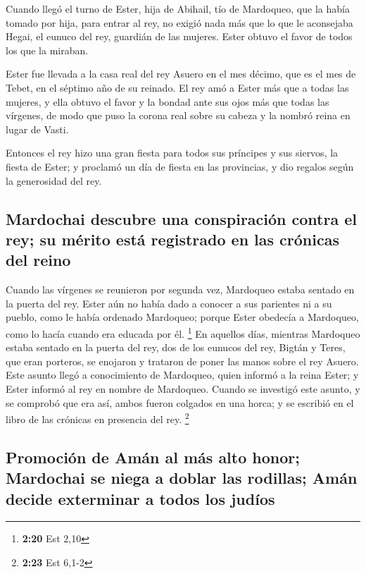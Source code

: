  Cuando llegó el turno de Ester, hija de Abihail, tío de
Mardoqueo, que la había tomado por hija, para entrar al rey, no exigió
nada más que lo que le aconsejaba Hegai, el eunuco del rey, guardián de
las mujeres. Ester obtuvo el favor de todos los que la miraban.

 Ester fue llevada a la casa real del rey Asuero en el
mes décimo, que es el mes de Tebet, en el séptimo año de su reinado.
 El rey amó a Ester más que a todas las mujeres, y ella
obtuvo el favor y la bondad ante sus ojos más que todas las vírgenes, de
modo que puso la corona real sobre su cabeza y la nombró reina en lugar
de Vasti.

 Entonces el rey hizo una gran fiesta para todos sus
príncipes y sus siervos, la fiesta de Ester; y proclamó un día de fiesta
en las provincias, y dio regalos según la generosidad del rey.

\hypertarget{mardochai-descubre-una-conspiraciuxf3n-contra-el-rey-su-muxe9rito-estuxe1-registrado-en-las-cruxf3nicas-del-reino}{%
\subsection{Mardochai descubre una conspiración contra el rey; su mérito
está registrado en las crónicas del
reino}\label{mardochai-descubre-una-conspiraciuxf3n-contra-el-rey-su-muxe9rito-estuxe1-registrado-en-las-cruxf3nicas-del-reino}}

 Cuando las vírgenes se reunieron por segunda vez,
Mardoqueo estaba sentado en la puerta del rey.  Ester aún
no había dado a conocer a sus parientes ni a su pueblo, como le había
ordenado Mardoqueo; porque Ester obedecía a Mardoqueo, como lo hacía
cuando era educada por él. \footnote{\textbf{2:20} Est 2,10}
 En aquellos días, mientras Mardoqueo estaba sentado en
la puerta del rey, dos de los eunucos del rey, Bigtán y Teres, que eran
porteros, se enojaron y trataron de poner las manos sobre el rey Asuero.
 Este asunto llegó a conocimiento de Mardoqueo, quien
informó a la reina Ester; y Ester informó al rey en nombre de Mardoqueo.
 Cuando se investigó este asunto, y se comprobó que era
así, ambos fueron colgados en una horca; y se escribió en el libro de
las crónicas en presencia del rey. \footnote{\textbf{2:23} Est 6,1-2}

\hypertarget{promociuxf3n-de-amuxe1n-al-muxe1s-alto-honor-mardochai-se-niega-a-doblar-las-rodillas-amuxe1n-decide-exterminar-a-todos-los-juduxedos}{%
\subsection{Promoción de Amán al más alto honor; Mardochai se niega a
doblar las rodillas; Amán decide exterminar a todos los
judíos}\label{promociuxf3n-de-amuxe1n-al-muxe1s-alto-honor-mardochai-se-niega-a-doblar-las-rodillas-amuxe1n-decide-exterminar-a-todos-los-juduxedos}}

